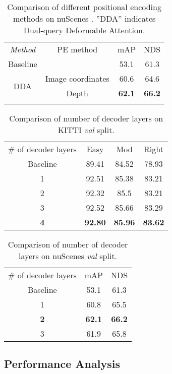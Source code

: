 \documentclass[lettersize,journal]{IEEEtran}
\begin{document}
 
\begin{table}[t]
\renewcommand{\arraystretch}{1.0}
\centering
\caption{Comparison of different positional encoding methods on nuScenes . ”DDA” indicates Dual-query Deformable Attention.}
\begin{tabular}{cccc}
\cline{1-4}
\textit{Method}    & PE method      & mAP  & NDS  \\
\cline{1-4}
Baseline\cite{centerpoint}& & 53.1 & 61.3 \\
\cline{1-4}
\multirow{2}{*}{DDA}  
         & Image coordinates    & 60.6 & 64.6 \\
& Depth        & \textbf{62.1} & \textbf{66.2} \\
\cline{1-4}
\label{table:abl_pe}
\end{tabular}
\vspace{-0.5cm}
\end{table} \begin{table}[t]
\renewcommand{\arraystretch}{1.0}
\centering
\caption{Comparison of number of decoder layers on KITTI \textit{val} split.}

    \centering
    \begin{tabular}{cccc}
    \cline{1-4}
    \# of decoder layers & Easy  & Mod   & Right \\ 
    \cline{1-4}
    Baseline\cite{voxelrcnn}       & 89.41 & 84.52 & 78.93 \\
    \cline{1-4}
    1                    & 92.51 & 85.38 & 83.21 \\
    2                    & 92.32 & 85.5  & 83.21 \\
    3                    & 92.52 & 85.66 & 83.29 \\
    \textbf{4}                    & \textbf{92.80} & \textbf{85.96} & \textbf{83.62} \\
    \cline{1-4}
    \end{tabular}
\label{table:abl_num_encoder_layer_kitti}
\vspace{-0.2cm}
\end{table} \begin{table}[htb!]
\renewcommand{\arraystretch}{1.0}
\centering
\caption{Comparison of number of decoder layers on nuScenes \textit{val} split.}

    \centering
    \begin{tabular}{ccc}
    \cline{1-3}
    \# of decoder layers & mAP  & NDS   \\
    \cline{1-3}
    Baseline\cite{centerpoint}       & 53.1 & 61.3 \\
    \cline{1-3}
    1                    & 60.8 & 65.5 \\
    \textbf{2}                    & \textbf{62.1} & \textbf{66.2} \\
    3                    & 61.9 & 65.8 \\
    \cline{1-3}
    \end{tabular}


\label{table:abl_num_encoder_layer_nus}
\end{table} \subsection{Performance Analysis}
\end{document}
